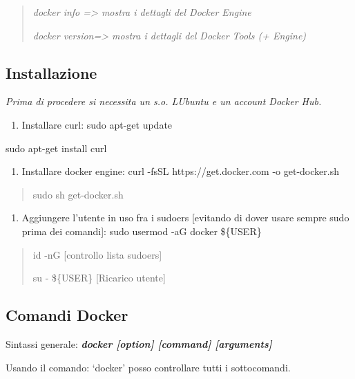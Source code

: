 \begin{quote}
\emph{docker info =\textgreater{} mostra i dettagli del Docker Engine}

\emph{docker version=\textgreater{} mostra i dettagli del Docker Tools
(+ Engine)}
\end{quote}

\subsection{Installazione}\label{installazione}

\emph{Prima di procedere si necessita un s.o. LUbuntu e un account
Docker Hub.}

\begin{enumerate}
\def\labelenumi{\arabic{enumi}.}
\item
  Installare curl: sudo apt-get update
\end{enumerate}

sudo apt-get install curl

\begin{enumerate}
\def\labelenumi{\arabic{enumi}.}
\setcounter{enumi}{1}
\item
  Installare docker engine: curl -fsSL https://get.docker.com -o
  get-docker.sh
\end{enumerate}

\begin{quote}
sudo sh get-docker.sh
\end{quote}

\begin{enumerate}
\def\labelenumi{\arabic{enumi}.}
\setcounter{enumi}{2}
\item
  Aggiungere l'utente in uso fra i sudoers {[}evitando di dover usare
  sempre sudo prima dei comandi{]}: sudo usermod -aG docker \$\{USER\}
\end{enumerate}

\begin{quote}
id -nG {[}controllo lista sudoers{]}

su - \$\{USER\} {[}Ricarico utente{]}
\end{quote}

\subsection{Comandi Docker}\label{comandi-docker}

Sintassi generale: \emph{\textbf{docker {[}option{]} {[}command{]}
{[}arguments{]}}}

Usando il comando: `docker' posso controllare tutti i sottocomandi.

